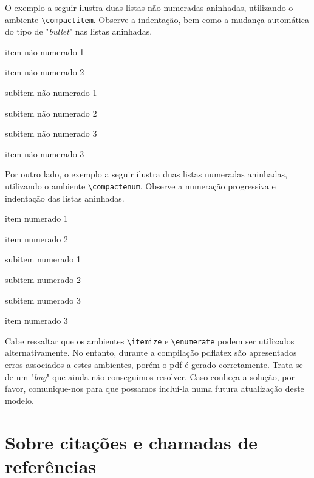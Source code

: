 \begin{apendicesenv}
O exemplo a seguir ilustra duas listas não numeradas aninhadas, utilizando o ambiente \verb|\compactitem|. Observe a indentação, bem como a mudança automática do tipo de "\textit{bullet}"{} nas listas aninhadas.



\begin{compactitem}
	\item item não numerado 1
	\item item não numerado 2
	\begin{compactitem}
		\item subitem não numerado 1
		\item subitem não numerado 2
		\item subitem não numerado 3
	\end{compactitem}
	\item item não numerado 3
\end{compactitem}


Por outro lado, o exemplo a seguir ilustra duas listas numeradas aninhadas, utilizando o ambiente \verb|\compactenum|. Observe a numeração progressiva e indentação das listas aninhadas.


\begin{compactenum}
	\item item numerado 1
	\item item numerado 2
	\begin{compactenum}
		\item subitem numerado 1
		\item subitem numerado 2
		\item subitem numerado 3
	\end{compactenum}
	\item item numerado 3
\end{compactenum}

Cabe ressaltar que os ambientes \verb|\itemize| e \verb|\enumerate| podem ser utilizados alternativamente. No entanto, durante a compilação pdflatex são apresentados erros associados a estes ambientes, porém o pdf é gerado corretamente. Trata-se de um "\textit{bug}"{} que ainda não conseguimos resolver. Caso conheça a solução, por favor, comunique-nos para que possamos incluí-la numa futura atualização deste modelo.



\chapter{Sobre citações e chamadas de referências}
\label{chap:apSobreCita}



\end{apendicesenv}
